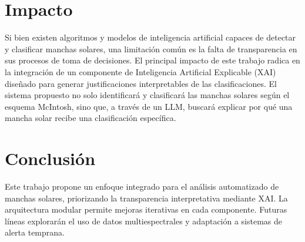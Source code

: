 \documentclass[conference]{IEEEtran}
\begin{document}
\section*{Impacto}

Si bien existen algoritmos y modelos de inteligencia artificial capaces de detectar y clasificar manchas solares, una limitación común es la falta de transparencia en sus procesos de toma de decisiones. El principal impacto de este trabajo radica en la integración de un componente de Inteligencia Artificial Explicable (XAI) diseñado para generar justificaciones interpretables de las clasificaciones.
El sistema propuesto no solo identificará y clasificará las manchas solares según el esquema McIntosh, sino que, a través de un LLM, buscará explicar por qué una mancha solar recibe una clasificación específica.

\section*{Conclusión}
Este trabajo propone un enfoque integrado para el análisis automatizado de manchas solares, priorizando la transparencia interpretativa mediante XAI. La arquitectura modular permite mejoras iterativas en cada componente. Futuras líneas explorarán el uso de datos multiespectrales y adaptación a sistemas de alerta temprana.
\end{document}

